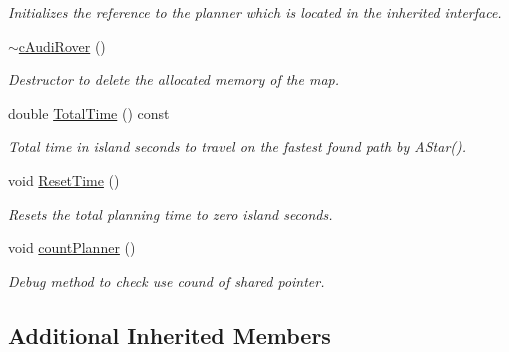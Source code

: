\begin{DoxyCompactItemize}
\begin{DoxyCompactList}\small\item\em Initializes the reference to the planner which is located in the inherited interface. \end{DoxyCompactList}\item 
\mbox{\label{classplanner_1_1c_audi_rover_a9057332995c0ac8a286551345aee9cc7}} 
\mbox{\hyperlink{classplanner_1_1c_audi_rover_a9057332995c0ac8a286551345aee9cc7}{$\sim$c\+Audi\+Rover}} ()
\begin{DoxyCompactList}\small\item\em Destructor to delete the allocated memory of the map. \end{DoxyCompactList}\item 
\mbox{\label{classplanner_1_1c_audi_rover_a3457f112b5906654ca4dbefef7ea7e46}} 
double \mbox{\hyperlink{classplanner_1_1c_audi_rover_a3457f112b5906654ca4dbefef7ea7e46}{Total\+Time}} () const
\begin{DoxyCompactList}\small\item\em Total time in island seconds to travel on the fastest found path by A\+Star(). \end{DoxyCompactList}\item 
\mbox{\label{classplanner_1_1c_audi_rover_a581d4a30c727d6fbe224b317834a45ba}} 
void \mbox{\hyperlink{classplanner_1_1c_audi_rover_a581d4a30c727d6fbe224b317834a45ba}{Reset\+Time}} ()
\begin{DoxyCompactList}\small\item\em Resets the total planning time to zero island seconds. \end{DoxyCompactList}\item 
\mbox{\label{classplanner_1_1c_audi_rover_ab4ff29dbdcf096e9f3ec0a734ed7b2d3}} 
void \mbox{\hyperlink{classplanner_1_1c_audi_rover_ab4ff29dbdcf096e9f3ec0a734ed7b2d3}{count\+Planner}} ()
\begin{DoxyCompactList}\small\item\em Debug method to check use cound of shared pointer. \end{DoxyCompactList}\end{DoxyCompactItemize}
\subsection*{Additional Inherited Members}


